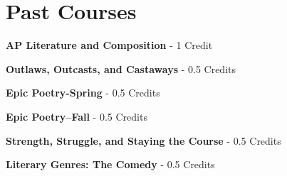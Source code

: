 \section{Past Courses}

\noindent\textbf{AP Literature and Composition}  - 1 Credit

\vspace{3mm}
\noindent\textbf{Outlaws, Outcasts, and Castaways}  - 0.5 Credits

\vspace{3mm}
\noindent\textbf{Epic Poetry-Spring}  - 0.5 Credits

\vspace{3mm}
\noindent\textbf{Epic Poetry--Fall}  - 0.5 Credits

\vspace{3mm}
\noindent\textbf{Strength, Struggle, and Staying the Course}  - 0.5 Credits

\vspace{3mm}
\noindent\textbf{Literary Genres:  The Comedy}  - 0.5 Credits

\vspace{3mm}
